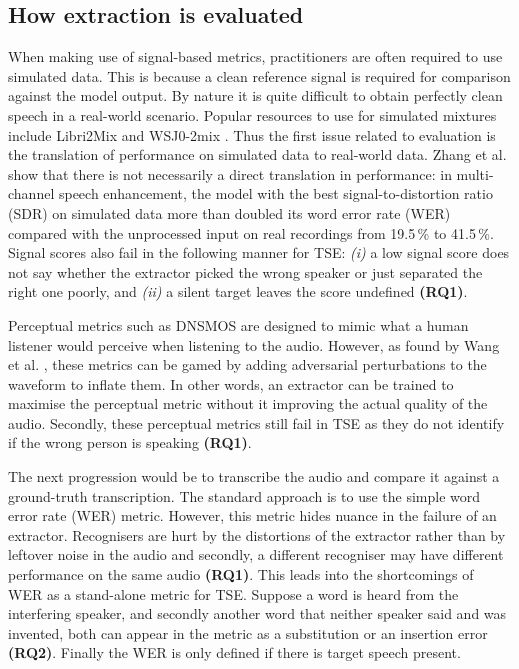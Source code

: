 \subsection{How extraction is evaluated}
\label{sec:evaluation}
When making use of signal-based metrics, practitioners are often required to use simulated data. This is because a clean reference signal is required for comparison against the model output. By nature it is quite difficult to obtain perfectly clean speech in a real-world scenario. Popular resources to use for simulated mixtures include Libri2Mix \cite{cosentino2020librimix} and WSJ0-2mix \cite{hershey2016deep}. Thus the first issue related to evaluation is the translation of performance on simulated data to real-world data. Zhang et al. \cite{zhang2021closing} show that there is not necessarily a direct translation in performance: in multi-channel speech enhancement, the model with the best signal-to-distortion ratio (SDR) on simulated data more than doubled its word error rate (WER) compared with the unprocessed input on real recordings from 19.5\,\% to 41.5\,\%. Signal scores also fail in the following manner for TSE: \textit{(i)} a low signal score does not say whether the extractor picked the wrong speaker or just separated the right one poorly, and \textit{(ii)} a silent target leaves the score undefined \textbf{(RQ1)}.

Perceptual metrics such as  DNSMOS \cite{reddy2021dnsmos} are designed to mimic what a human listener would perceive when listening to the audio. However, as found by Wang et al. \cite{wang2026realtse}, these metrics can be gamed by adding adversarial perturbations to the waveform to inflate them. In other words, an extractor can be trained to maximise the perceptual metric without it improving the actual quality of the audio. Secondly, these perceptual metrics still fail in TSE as they do not identify if the wrong person is speaking \textbf{(RQ1)}.

The next progression would be to transcribe the audio and compare it against a ground-truth transcription. The standard approach is to use the simple word error rate (WER) metric. However, this metric hides nuance in the failure of an extractor. Recognisers are hurt by the distortions of the extractor rather than by leftover noise in the audio \cite{iwamoto2022bad} and secondly, a different recogniser may have different performance on the same audio \textbf{(RQ1)}. This leads into the shortcomings of WER as a stand-alone metric for TSE. Suppose a word is heard from the interfering speaker, and secondly another word that neither speaker said and was invented, both can appear in the metric as a substitution or an insertion error \textbf{(RQ2)}. Finally the WER is only defined if there is target speech present.

